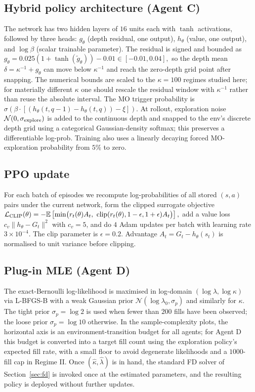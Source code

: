 \documentclass[]{interact}
\theoremstyle{plain}
\theoremstyle{definition}
\theoremstyle{remark}
\newcommand{\E}{\mathbb{E}}
\newcommand{\1}[1]{\mathbf{1}_{\{#1\}}}
\begin{document}
\subsection{Hybrid policy architecture (Agent C)}\label{app:hybrid-arch}
The network has two hidden layers of $16$ units each with $\tanh$ activations, followed by three heads: $g_\theta$ (depth residual, one output), $h_\theta$ (value, one output), and $\log\beta$ (scalar trainable parameter). The residual is signed and bounded as
$
g_\theta = 0.025(1+\tanh(\tilde g_\theta))-0.01 \in [-0.01,0.04],
$
so the depth mean $\delta = \kappa^{-1} + g_\theta$ can move below $\kappa^{-1}$ and reach the zero-depth grid point after snapping. The numerical bounds are scaled to the $\kappa=100$ regimes studied here; for materially different $\kappa$ one should rescale the residual window with $\kappa^{-1}$ rather than reuse the absolute interval. The MO trigger probability is $\sigma(\beta \cdot [(h_\theta(t, q-1) - h_\theta(t, q)) - \xi])$. At rollout, exploration noise $\mathcal{N}(0, \sigma_{\rm explore})$ is added to the continuous depth and snapped to the env's discrete depth grid using a categorical Gaussian-density softmax; this preserves a differentiable log-prob. Training also uses a linearly decaying forced MO-exploration probability from $5\%$ to zero.

\subsection{PPO update}\label{app:ppo}
For each batch of episodes we recompute log-probabilities of all stored $(s, a)$ pairs under the current network, form the clipped surrogate objective
$
\mathcal{L}_{\rm CLIP}(\theta) = -\E\left[ \min\bigl( r_t(\theta) A_t,\ \text{clip}(r_t(\theta), 1 - \epsilon, 1 + \epsilon) A_t \bigr) \right],
$
add a value loss $c_v \|h_\theta - G_t\|^2$ with $c_v = 5$, and do $4$ Adam updates per batch with learning rate $3 \times 10^{-4}$. The clip parameter is $\epsilon = 0.2$. Advantage $A_t = G_t - h_\theta(s_t)$ is normalised to unit variance before clipping.

\subsection{Plug-in MLE (Agent D)}\label{app:plugin}
The exact-Bernoulli log-likelihood is maximised in log-domain $(\log \lambda, \log \kappa)$ via L-BFGS-B with a weak Gaussian prior $\mathcal{N}(\log \lambda_0, \sigma_p)$ and similarly for $\kappa$. The tight prior $\sigma_p = \log 2$ is used when fewer than $200$ fills have been observed; the loose prior $\sigma_p = \log 10$ otherwise. In the sample-complexity plots, the horizontal axis is an environment-transition budget for all agents; for Agent D this budget is converted into a target fill count using the exploration policy's expected fill rate, with a small floor to avoid degenerate likelihoods and a $1000$-fill cap in Regime II. Once $(\hat\kappa, \hat\lambda)$ is in hand, the standard FD solver of Section~\ref{sec:fd} is invoked once at the estimated parameters, and the resulting policy is deployed without further updates.
\end{document}
